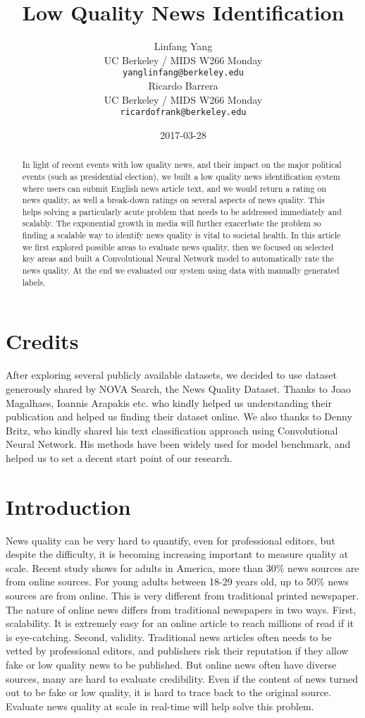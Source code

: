 \documentclass[11pt]{article}
\title{Low Quality News Identification}
\author{Linfang Yang \\
  UC Berkeley / MIDS W266 Monday\\
  {\tt yanglinfang@berkeley.edu} \\\And
  Ricardo Barrera \\
  UC Berkeley / MIDS W266 Monday \\
  {\tt ricardofrank@berkeley.edu} \\}
\date{2017-03-28}
\begin{document}
\maketitle
\begin{abstract}
 In light of recent events with low quality news, and their impact on the major political events (such as presidential election), we built a low quality news identification system where users can submit English news article text, and we would return a rating on news quality, as well a break-down ratings on several aspects of news quality.  This helps solving a particularly acute problem that needs to be addressed immediately and scalably. The exponential growth in media will further exacerbate the problem so finding a scalable way to identify news quality is vital to societal health. In this article we first explored possible areas to evaluate news quality, then we focused on selected key areas and built a Convolutional Neural Network model to automatically rate the news quality. At the end we evaluated our system using data with manually generated labels. 
\end{abstract}

\section{Credits}

After exploring several publicly available datasets, we decided to use dataset generously shared by NOVA Search, the News Quality Dataset. Thanks to Joao Magalhaes, Ioannis Arapakis etc. who kindly helped us understanding their publication and helped us finding their dataset online. We also thanks to Denny Britz, who kindly shared his text classification approach using Convolutional Neural Network. His methods have been widely used for model benchmark, and helped us to set a decent start point of our research. 

\section{Introduction}

News quality can be very hard to quantify, even for professional editors, but despite the difficulty, it is becoming increasing important to measure quality at scale. Recent study shows for adults in America, more than 30\% news sources are from online sources. For young adults between 18-29 years old, up to 50\% news sources are from online. This is very different from traditional printed newspaper. The nature of online news differs from traditional newspapers in two ways. First, scalability. It is extremely easy for an online article to reach millions of read if it is eye-catching. Second, validity. Traditional news articles often needs to be vetted by professional editors, and publishers risk their reputation if they allow fake or low quality news to be published. But online news often have diverse sources, many are hard to evaluate credibility. Even if the content of news turned out to be fake or low quality, it is hard to trace back to the original source.  Evaluate news quality at scale in real-time will help solve this problem.  
\end{document}
